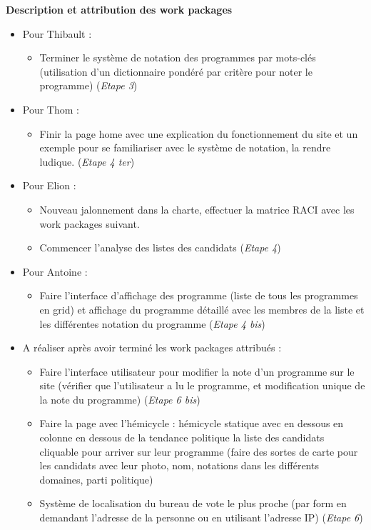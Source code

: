 \noindent
\textbf{Description et attribution des work packages}
\begin{itemize}
    \item Pour Thibault :
\begin{itemize}
    \item Terminer le système de notation des programmes par mots-clés (utilisation d’un dictionnaire pondéré par critère pour noter le programme) (\textit{Etape 3})
\end{itemize}
\end{itemize}
\begin{itemize}
    \item Pour Thom :
\begin{itemize}
    \item Finir la page home avec une explication du fonctionnement du site et un exemple pour se familiariser avec le système de notation, la rendre ludique. (\textit{Etape 4 ter})
\end{itemize}
\end{itemize}
\begin{itemize}
    \item Pour Elion :
\begin{itemize}
    \item Nouveau jalonnement dans la charte, effectuer la matrice RACI avec les work packages suivant.
    \item Commencer l'analyse des listes des candidats (\textit{Etape 4})
\end{itemize}
\end{itemize}
\begin{itemize}
    \item Pour Antoine :
\begin{itemize}
    \item Faire l’interface d’affichage des programme (liste de tous les programmes en grid) et affichage du programme détaillé avec les membres de la liste et les différentes notation du programme (\textit{Etape 4 bis})
\end{itemize}
\end{itemize}
\begin{itemize}
    \item A réaliser après avoir terminé les work packages attribués :
\begin{itemize}
    \item Faire l’interface utilisateur pour modifier la note d’un programme sur le site (vérifier que l’utilisateur a lu le programme, et modification unique de la note du programme) (\textit{Etape 6 bis})
    \item Faire la page avec l'hémicycle : hémicycle statique avec en dessous en colonne en dessous de la tendance politique la liste des candidats cliquable pour arriver sur leur programme (faire des sortes de carte pour les candidats avec leur photo, nom, notations dans les différents domaines, parti politique)
    \item Système de localisation du bureau de vote le plus proche (par form en demandant l’adresse de la personne ou en utilisant l’adresse IP) (\textit{Etape 6})
\end{itemize}
\end{itemize}

